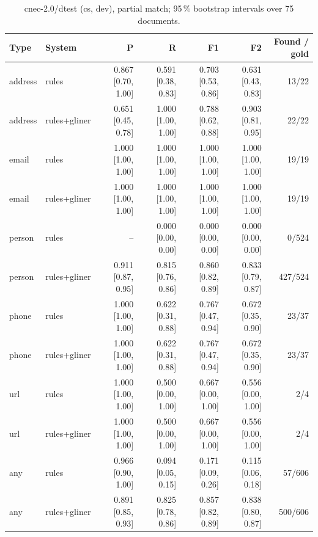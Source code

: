 \providecommand{\ci}[2]{{\scriptsize [#1, #2]}}

\begin{table}[htbp]
\centering
\small
\begin{tabular}{llrrrrr}
\toprule
Type & System & P & R & F1 & F2 & Found / gold \\
\midrule
address & rules & 0.867 \ci{0.70}{1.00} & 0.591 \ci{0.38}{0.83} & 0.703 \ci{0.53}{0.86} & 0.631 \ci{0.43}{0.83} & 13/22 \\
address & rules+gliner & 0.651 \ci{0.45}{0.78} & 1.000 \ci{1.00}{1.00} & 0.788 \ci{0.62}{0.88} & 0.903 \ci{0.81}{0.95} & 22/22 \\
email & rules & 1.000 \ci{1.00}{1.00} & 1.000 \ci{1.00}{1.00} & 1.000 \ci{1.00}{1.00} & 1.000 \ci{1.00}{1.00} & 19/19 \\
email & rules+gliner & 1.000 \ci{1.00}{1.00} & 1.000 \ci{1.00}{1.00} & 1.000 \ci{1.00}{1.00} & 1.000 \ci{1.00}{1.00} & 19/19 \\
person & rules & -- & 0.000 \ci{0.00}{0.00} & 0.000 \ci{0.00}{0.00} & 0.000 \ci{0.00}{0.00} & 0/524 \\
person & rules+gliner & 0.911 \ci{0.87}{0.95} & 0.815 \ci{0.76}{0.86} & 0.860 \ci{0.82}{0.89} & 0.833 \ci{0.79}{0.87} & 427/524 \\
phone & rules & 1.000 \ci{1.00}{1.00} & 0.622 \ci{0.31}{0.88} & 0.767 \ci{0.47}{0.94} & 0.672 \ci{0.35}{0.90} & 23/37 \\
phone & rules+gliner & 1.000 \ci{1.00}{1.00} & 0.622 \ci{0.31}{0.88} & 0.767 \ci{0.47}{0.94} & 0.672 \ci{0.35}{0.90} & 23/37 \\
url & rules & 1.000 \ci{1.00}{1.00} & 0.500 \ci{0.00}{1.00} & 0.667 \ci{0.00}{1.00} & 0.556 \ci{0.00}{1.00} & 2/4 \\
url & rules+gliner & 1.000 \ci{1.00}{1.00} & 0.500 \ci{0.00}{1.00} & 0.667 \ci{0.00}{1.00} & 0.556 \ci{0.00}{1.00} & 2/4 \\
any & rules & 0.966 \ci{0.90}{1.00} & 0.094 \ci{0.05}{0.15} & 0.171 \ci{0.09}{0.26} & 0.115 \ci{0.06}{0.18} & 57/606 \\
any & rules+gliner & 0.891 \ci{0.85}{0.93} & 0.825 \ci{0.78}{0.86} & 0.857 \ci{0.82}{0.89} & 0.838 \ci{0.80}{0.87} & 500/606 \\
\bottomrule
\end{tabular}
\caption{cnec-2.0/dtest (cs, dev), partial match; 95\,\% bootstrap intervals over 75 documents.}
\label{tab:rq1-dev-cnec-2.0-dtest-partial}
\end{table}

